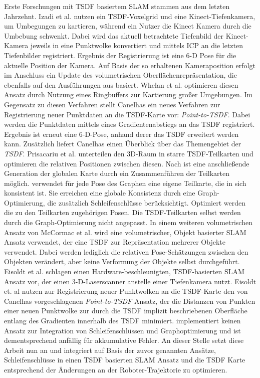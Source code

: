 Erste Forschungen mit TSDF basiertem SLAM stammen aus dem letzten Jahrzehnt.
Izadi et al. \cite{izadi2011kinectfusion} nutzen ein TSDF-Voxelgrid und eine Kinect-Tiefenkamera, um Umbegungen zu kartieren, während ein Nutzer die Kinect Kamera durch die Umbebung schwenkt. Dabei wird das aktuell betrachtete Tiefenbild der Kinect-Kamera jeweils in eine Punktwolke konvertiert und mittels ICP an die letzten Tiefenbilder registriert. Ergebnis der Registrierung ist eine 6-D Pose für die aktuelle Position der Kamera. Auf Basis der so erhaltenen Kameraposition erfolgt im Anschluss ein Update des volumetrischen Oberflächenrepräsentation, die ebenfalls auf den Ausführungen aus \cite{curless1996volumetric} basiert. Whelan et al. \cite{whelan2012kintinuous} optimieren diesen Ansatz durch Nutzung eines Ringbuffers zur Kartierung großer Umgebungen. Im Gegensatz zu diesen Verfahren stellt Canelhas \cite{Canelhas2017TruncatedSD} ein neues Verfahren zur Registrierung neuer Punktdaten an die TSDF-Karte vor: \emph{Point-to-TSDF}. Dabei werden die Punktdaten mittels eines Gradientenabstiegs an das TSDF registriert. Ergebnis ist erneut eine 6-D-Pose, anhand derer das TSDF erweitert werden kann. Zusätzlich liefert Canelhas \cite{Canelhas2017TruncatedSD} einen Überblick über das Themengebiet der \emph{TSDF}. Prisacariu et al. \cite{prisacariu2017infinitam} unterteilen den 3D-Raum in starre TSDF-Teilkarten und optimieren die relativen Positionen zwischen diesen. Nach \cite{prisacariu2017infinitam} ist eine anschließende Generation der globalen Karte durch ein Zusammenführen der Teilkarten möglich. \cite{prisacariu2017infinitam} verwendet für jede Pose des Graphen eine eigene Teilkarte, die in sich konsistent ist. Sie erreichen eine globale Konsistenz durch eine Graph-Optimierung, die zusätzlich Schleifenschlüsse berücksichtigt. Optimiert werden die zu den Teilkarten zugehörigen Posen. Die TSDF-Teilkarten selbst werden durch die Graph-Optimierung nicht angepasst. In einem weiteren volumetrischen Ansatz von McCormac et al. \cite{mccormac2018fusion++} wird eine volumetrischer, Objekt basierter SLAM Ansatz verwendet, der eine TSDF zur Repräsentation mehrerer Objekte verwendet. Dabei werden lediglich die relativen Pose-Schätzungen zwischen den Objekten verändert, aber keine Verformung der Objekte selbst durchgeführt. Eisoldt et al. \cite{HATSDF} schlagen einen Hardware-beschleunigten, TSDF-basierten SLAM Ansatz vor, der einen 3-D-Laserscanner anstelle einer Tiefenkamera nutzt. Eisoldt et. al \cite{HATSDF} nutzen zur Registrierung neuer Punktwolken an die TSDF-Karte den von Canelhas \cite{Canelhas2017TruncatedSD} vorgeschlagenen \emph{Point-to-TSDF} Ansatz, der die Distanzen von Punkten einer neuen Punktwolke zur durch die TSDF implizit beschriebenen Oberfläche entlang des Gradienten innerhalb des TSDF minimiert. \cite{HATSDF} implementiert keinen Ansatz zur Integration von Schleifenschlüssen und Graphoptimierung und ist dementsprechend anfällig für akkumulative Fehler. An dieser Stelle setzt diese Arbeit nun an und integriert auf Basis der zuvor genannten Ansätze, Schleifenschlüsse in einen TSDF basierten SLAM Ansatz und die TSDF Karte entsprechend der Änderungen an der Roboter-Trajektorie zu optimieren.





